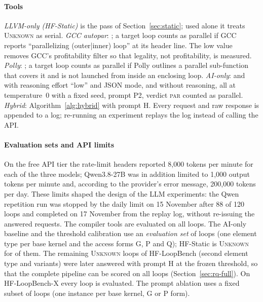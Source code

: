 \paragraph{Tools}
\textit{LLVM-only (HF-Static)} is the pass of Section~\ref{sec:static}; used alone it treats \textsc{Unknown} as serial.
\textit{GCC autopar}: ; a target loop counts as parallel if GCC reports ``parallelizing (outer|inner) loop'' at its header line. The low  value removes GCC's profitability filter so that legality, not profitability, is measured.
\textit{Polly}: ; a target loop counts as parallel if Polly outlines a parallel sub-function that covers it and is not launched from inside an enclosing loop.
\textit{AI-only}:  and  with reasoning effort ``low'' and JSON mode, and  without reasoning, all at temperature~0 with a fixed seed, prompt P2, verdict \textsc{par} counted as parallel.
\textit{Hybrid}: Algorithm~\ref{alg:hybrid} with prompt H. Every request and raw response is appended to a log; re-running an experiment replays the log instead of calling the API.

\paragraph{Evaluation sets and API limits} On the free API tier the rate-limit headers reported 8{,}000 tokens per minute for each of the three models; Qwen3.8-27B was in addition limited to 1{,}000 output tokens per minute and, according to the provider's error message, 200{,}000 tokens per day. These limits shaped the design of the LLM experiments: the Qwen repetition run was stopped by the daily limit on 15 November after 88 of 120 loops and completed on 17 November from the replay log, without re-issuing the answered requests. The compiler tools are evaluated on all \nBenchLoops{} loops. The AI-only baseline and the threshold calibration use an \emph{evaluation set} of \nEvalLoops{} loops (one element type per base kernel and the access forms G, P and Q); HF-Static is \textsc{Unknown} for \nEvalUnknown{} of them. The remaining \textsc{Unknown} loops of HF-LoopBench (second element type and  variants) were later answered with prompt H at the frozen threshold, so that the complete pipeline can be scored on all loops (Section~\ref{sec:rq-full}). On HF-LoopBench-X every loop is evaluated. The prompt ablation uses a fixed subset of \nAblLoops{} loops (one instance per base kernel, G or P form).

